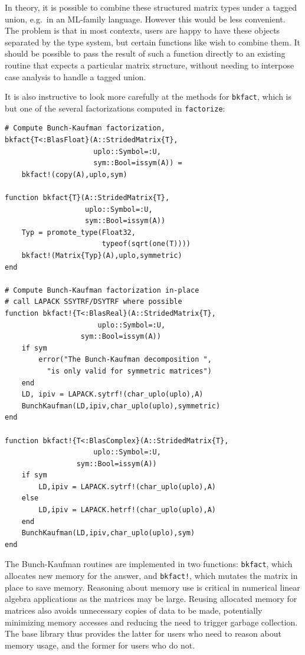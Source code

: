 \documentclass[10pt, preprint]{sigplanconf}
\begin{document}
In theory, it is possible to combine these structured matrix types under a
tagged union, e.g.\ in an ML-family language. However this would be
less convenient. The problem is that in most contexts,
users are happy to have these objects separated by the type system, but
certain functions like  wish to combine them. It should be
possible to pass the result of such a function directly to an existing
routine that expects a particular matrix structure, without needing to
interpose case analysis to handle a tagged union.

It is also instructive to look more carefully at the methods for \verb|bkfact|,
which is but one of the several factorizations computed in \verb|factorize|:

\begin{lstlisting}
# Compute Bunch-Kaufman factorization,
bkfact{T<:BlasFloat}(A::StridedMatrix{T},
                     uplo::Symbol=:U,
                     sym::Bool=issym(A)) =
    bkfact!(copy(A),uplo,sym)

function bkfact{T}(A::StridedMatrix{T},
                   uplo::Symbol=:U,
                   sym::Bool=issym(A))
    Typ = promote_type(Float32,
                       typeof(sqrt(one(T))))
    bkfact!(Matrix{Typ}(A),uplo,symmetric)
end

# Compute Bunch-Kaufman factorization in-place
# call LAPACK SSYTRF/DSYTRF where possible
function bkfact!{T<:BlasReal}(A::StridedMatrix{T},
		              uplo::Symbol=:U,
			      sym::Bool=issym(A))
    if sym
        error("The Bunch-Kaufman decomposition ",
	      "is only valid for symmetric matrices")
    end
    LD, ipiv = LAPACK.sytrf!(char_uplo(uplo),A)
    BunchKaufman(LD,ipiv,char_uplo(uplo),symmetric)
end

function bkfact!{T<:BlasComplex}(A::StridedMatrix{T},
	    			 uplo::Symbol=:U,
				 sym::Bool=issym(A))
    if sym
        LD,ipiv = LAPACK.sytrf!(char_uplo(uplo),A)
    else
        LD,ipiv = LAPACK.hetrf!(char_uplo(uplo),A)
    end
    BunchKaufman(LD,ipiv,char_uplo(uplo),sym)
end
\end{lstlisting}

The Bunch-Kaufman routines are implemented in two functions: \verb|bkfact|,
which allocates new memory for the answer, and \verb|bkfact!|, which mutates
the matrix in place to save memory. Reasoning about memory use is critical in
numerical linear algebra applications as the matrices may be large.
Reusing allocated memory for matrices also avoids unnecessary copies of data to
be made, potentially minimizing memory accesses and reducing the need to
trigger garbage collection. The base library thus provides the latter for users
who need to reason about memory usage, and the former for users who do not.
\end{document}
